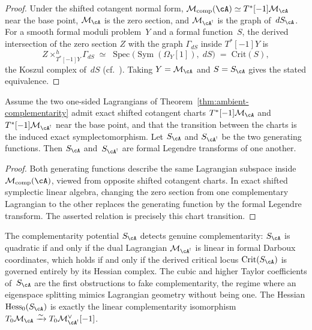 \begin{proof}
Under the shifted cotangent normal form,
$\mathcal{M}_{\mathrm{comp}}(\cA) \simeq T^*[-1]\mathcal{M}_\cA$
near the base point, $\mathcal{M}_\cA$ is the zero section, and
$\mathcal{M}_{\cA^!}$ is the graph of~$dS_\cA$. For a smooth
formal moduli problem~$Y$ and a formal function~$S$, the derived
intersection of the zero section $Z$ with the graph
$\Gamma_{dS}$ inside $T^*[-1]Y$ is
\[
Z \times^h_{T^*[-1]Y} \Gamma_{dS}
\;\simeq\;
\operatorname{Spec}\bigl(
\operatorname{Sym}(\Omega_Y[1]),\; dS\bigr)
\;=\;
\mathrm{Crit}(S),
\]
the Koszul complex of~$dS$
\textup{(}cf.~\cite[Proposition~2.1]{PTVV13}\textup{)}.
Taking $Y = \mathcal{M}_\cA$ and $S = S_\cA$ gives the stated
equivalence.
\end{proof}

\begin{proposition}
\label{prop:formal-legendre}
Assume the two one-sided Lagrangians of
Theorem~\textup{\ref{thm:ambient-complementarity}} admit exact
shifted cotangent charts
$T^*[-1]\mathcal{M}_\cA$ and
$T^*[-1]\mathcal{M}_{\cA^!}$ near the base point, and that the
transition between the charts is the induced exact
symplectomorphism. Let $S_\cA$ and $S_{\cA^!}$ be the two
generating functions. Then $S_\cA$ and~$S_{\cA^!}$ are formal
Legendre transforms of one another.
\end{proposition}

\begin{proof}
Both generating functions describe the same Lagrangian subspace
inside $\mathcal{M}_{\mathrm{comp}}(\cA)$, viewed from opposite
shifted cotangent charts. In exact shifted symplectic linear
algebra, changing the zero section from one complementary
Lagrangian to the other replaces the generating function by the
formal Legendre transform. The asserted relation is precisely this
chart transition.
\end{proof}

\begin{remark}
\label{rem:fake-complementarity}
The complementarity potential $S_\cA$ detects genuine
complementarity: $S_\cA$ is quadratic if and only if the
dual Lagrangian $\mathcal{M}_{\cA^!}$ is linear in
formal Darboux coordinates, which holds if and only if the
derived critical locus $\mathrm{Crit}(S_\cA)$ is governed
entirely by its Hessian complex. The cubic and higher Taylor
coefficients of~$S_\cA$ are the first obstructions to fake
complementarity, the regime where an eigenspace splitting
mimics Lagrangian geometry without being one. The
Hessian $\mathrm{Hess}_0(S_\cA)$ is exactly the linear
complementarity isomorphism
$T_0\mathcal{M}_\cA \xrightarrow{\sim}
T_0\mathcal{M}_{\cA^!}^\vee[-1]$.
\end{remark}

